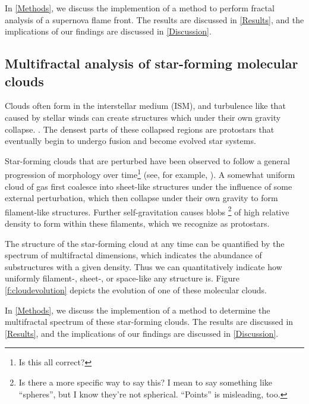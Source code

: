 \documentclass{emulateapj}
\begin{document}
In \textsection \ref{Methods}, we discuss the implemention of a method to perform fractal analysis of a supernova flame front. The results are discussed in \textsection \ref{Results}, and the implications of our findings are discussed in \textsection \ref{Discussion}.

\subsection{Multifractal analysis of star-forming molecular clouds}
Clouds often form in the interstellar medium (ISM), and turbulence like that caused by stellar winds can create structures which under their own gravity collapse. \citep{Bergin2007}. The densest parts of these collapsed regions are protostars that eventually begin to undergo fusion and become evolved star systems. 

Star-forming clouds that are perturbed have been observed to follow a general progression of morphology over time\footnote{Is this all correct?} (see, for example, \cite{Shu1987}). A somewhat uniform cloud of gas first coalesce into sheet-like structures under the influence of some external perturbation, which then collapse under their own gravity to form filament-like structures. Further self-gravitation causes blobs \footnote{Is there a more specific way to say this? I mean to say something like ``spheres'', but I know they're not spherical. ``Points'' is misleading, too.} of high relative density to form within these filaments, which we recognize as protostars.

The structure of the star-forming cloud at any time can be quantified by the spectrum of multifractal dimensions, which indicates the abundance of substructures with a given density. Thus we can quantitatively indicate how uniformly filament-, sheet-, or space-like any structure is. Figure \ref{f:cloudevolution} depicts the evolution of one of these molecular clouds.

In \textsection \ref{Methods}, we discuss the implemention of a method to determine the multifractal spectrum of these star-forming clouds. The results are discussed in \textsection \ref{Results}, and the implications of our findings are discussed in \textsection \ref{Discussion}.
\end{document}
